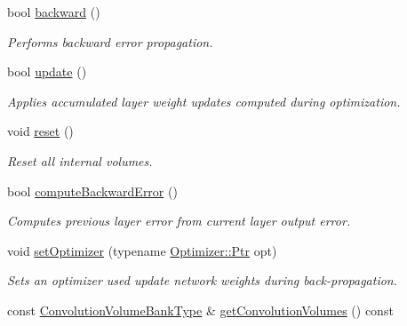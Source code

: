 \begin{DoxyCompactItemize}
bool \hyperlink{classffnn_1_1layer_1_1_convolution_a332b4eee045e04cee3b5ab47ad3836f1}{backward} ()
\begin{DoxyCompactList}\small\item\em Performs backward error propagation. \end{DoxyCompactList}\item 
bool \hyperlink{classffnn_1_1layer_1_1_convolution_ad0e91ef030bfa825af0aa0a5ab54ec57}{update} ()
\begin{DoxyCompactList}\small\item\em Applies accumulated layer weight updates computed during optimization. \end{DoxyCompactList}\item 
void \hyperlink{classffnn_1_1layer_1_1_convolution_a7f549224413e7d98641c60fc145ce284}{reset} ()
\begin{DoxyCompactList}\small\item\em Reset all internal volumes. \end{DoxyCompactList}\item 
bool \hyperlink{classffnn_1_1layer_1_1_convolution_ab85ef97a135b800781dd08fec5543d1d}{compute\-Backward\-Error} ()
\begin{DoxyCompactList}\small\item\em Computes previous layer error from current layer output error. \end{DoxyCompactList}\item 
void \hyperlink{classffnn_1_1layer_1_1_convolution_a220b97c160face15722249d651c40edb}{set\-Optimizer} (typename \hyperlink{classffnn_1_1optimizer_1_1_optimizer_ac03e7181934bf0c12a97fc67a60484ab}{Optimizer\-::\-Ptr} opt)
\begin{DoxyCompactList}\small\item\em Sets an optimizer used update network weights during back-\/propagation. \end{DoxyCompactList}\item 
const \hyperlink{classffnn_1_1layer_1_1_convolution_ab9d4759c7f52bcd098fb88382cc450a3}{Convolution\-Volume\-Bank\-Type} \& \hyperlink{classffnn_1_1layer_1_1_convolution_a8a9b90aa9faa8725acca9caa08ba3537}{get\-Convolution\-Volumes} () const 
\end{DoxyCompactItemize}
